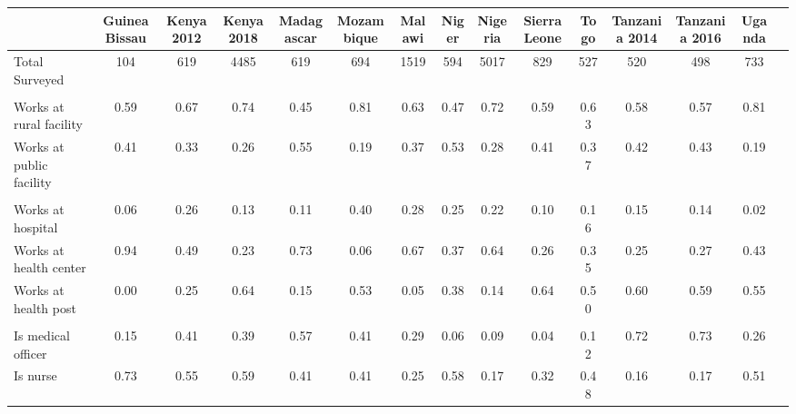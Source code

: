 \def\sym#1{\ifmmode^{#1}\else\(^{#1}\)\fi}
\begin{tabular}{l*{14}{c}}
\hline\hline
&\multicolumn{1}{c}{Guinea Bissau}&\multicolumn{1}{c}{Kenya 2012}&\multicolumn{1}{c}{Kenya 2018}&\multicolumn{1}{c}{Madagascar}&\multicolumn{1}{c}{Mozambique}&\multicolumn{1}{c}{Malawi}&\multicolumn{1}{c}{Niger}&\multicolumn{1}{c}{Nigeria}&\multicolumn{1}{c}{Sierra Leone}&\multicolumn{1}{c}{Togo}&\multicolumn{1}{c}{Tanzania 2014}&\multicolumn{1}{c}{Tanzania 2016}&\multicolumn{1}{c}{Uganda}&\\
\hline
Total Surveyed&                        {104}&        {619}&  {4485}&      {619}&        {694}&        {1519}&        {594}&        {5017}&        {829}&        {527}&       {520}&       {498}&       {733}\\
  &  {}\\
Works at rural facility&       {0.59}&        {0.67}&  {0.74}&  {0.45}&    {0.81}&        {0.63}&        {0.47}&        {0.72}&        {0.59}&        {0.63}&       {0.58}&       {0.57}&       {0.81}\\
Works at public facility&  {0.41}&    {0.33}&  {0.26}&  {0.55}&    {0.19}&        {0.37}&        {0.53}&        {0.28}&        {0.41}&        {0.37}&       {0.42}&       {0.43}&       {0.19}\\
 &   {}\\
Works at hospital&             {0.06}&        {0.26}&  {0.13}&  {0.11}&    {0.40}&        {0.28}&        {0.25}&        {0.22}&        {0.10}&        {0.16}&       {0.15}&       {0.14}&       {0.02}\\
Works at health center&        {0.94}&        {0.49}&  {0.23}&      {0.73}&        {0.06}&        {0.67}&        {0.37}&        {0.64}&        {0.26}&        {0.35}&       {0.25}&       {0.27}&       {0.43}\\
Works at health post&          {0.00}&        {0.25}&  {0.64}&  {0.15}&    {0.53}&        {0.05}&        {0.38}&        {0.14}&        {0.64}&        {0.50}&       {0.60}&       {0.59}&       {0.55}\\
 &   {}\\
Is medical officer&            {0.15}&        {0.41}&  {0.39}&  {0.57}&    {0.41}&        {0.29}&        {0.06}&        {0.09}&        {0.04}&        {0.12}&       {0.72}&       {0.73}&       {0.26}\\
Is nurse&                              {0.73}&        {0.55}&  {0.59}&  {0.41}&    {0.41}&        {0.25}&        {0.58}&        {0.17}&        {0.32}&        {0.48}&       {0.16}&       {0.17}&       {0.51}\\

\end{tabular}
